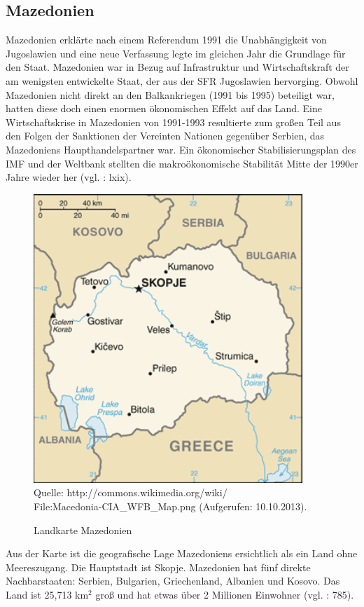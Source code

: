 \subsection{Mazedonien} 
Mazedonien erklärte nach einem Referendum 1991 die Unabhängigkeit von Jugoslawien und eine neue Verfassung legte im gleichen Jahr die Grundlage für den Staat. Mazedonien war in Bezug auf Infrastruktur und Wirtschaftskraft der am wenigsten entwickelte Staat, der aus der SFR Jugoslawien hervorging. Obwohl Mazedonien nicht direkt an den Balkankriegen (1991 bis 1995) beteiligt war, hatten diese doch einen enormen ökonomischen Effekt auf das Land. Eine Wirtschaftskrise in Mazedonien von 1991-1993 resultierte zum großen Teil aus den Folgen der Sanktionen der Vereinten Nationen gegenüber Serbien, das Mazedoniens Haupthandelspartner war. Ein ökonomischer Stabilisierungsplan des IMF und der Weltbank stellten die makroökonomische Stabilität Mitte der 1990er Jahre wieder her (vgl. \cite{bech09}: lxix). 
\begin{figure}[H]
\setlength\belowcaptionskip{10pt}
 \caption{Landkarte Mazedonien}
  \centering
  \includegraphics[width=4in]{Material/Macedonia-CIA_WFB_Map}\\
 Quelle: http://commons.wikimedia.org/wiki/\\
File:Macedonia-CIA\_WFB\_Map.png (Aufgerufen: 10.10.2013).
\end{figure}

Aus der Karte ist die geografische Lage Mazedoniens ersichtlich als ein Land ohne Meereszugang. Die Hauptstadt ist Skopje. Mazedonien hat fünf direkte Nachbarstaaten: Serbien, Bulgarien, Griechenland, Albanien und Kosovo. Das Land ist 25,713 km$^2$ groß und hat etwas über 2 Millionen Einwohner (vgl. \cite{ramet}: 785). 

